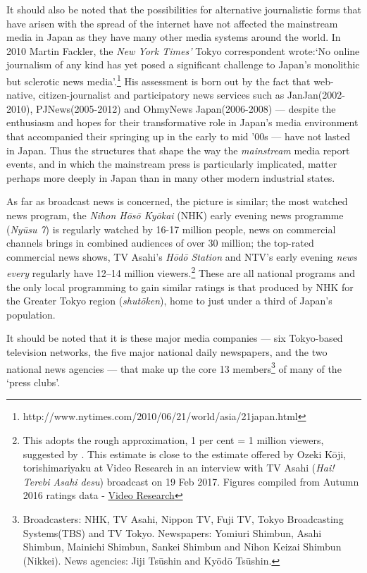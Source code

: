 \documentclass[11pt, headings=normal]{scrartcl}
\begin{document}
It should also be noted that the possibilities for alternative
journalistic forms that have arisen with the spread of the internet have
not affected the mainstream media in Japan as they have many other media
systems around the world. In 2010 Martin Fackler, the \emph{New York
Times'} Tokyo correspondent wrote:`No online journalism of any kind has
yet posed a significant challenge to Japan's monolithic but sclerotic
news media'\autocite{Fackler:2010}.\footnote{http://www.nytimes.com/2010/06/21/world/asia/21japan.html}
His assessment is born out by the fact that web-native,
citizen-journalist and participatory news services such as
JanJan(2002-2010), PJNews(2005-2012) and OhmyNews Japan(2006-2008) ---
despite the enthusiasm and hopes for their transformative role in
Japan's media environment that accompanied their springing up in the
early to mid '00s \autocite[ 72--3]{Hadl:2009} --- have not lasted in
Japan. Thus the structures that shape the way the \emph{mainstream}
media report events, and in which the mainstream press is particularly
implicated, matter perhaps more deeply in Japan than in many other
modern industrial states.

As far as broadcast news is concerned, the picture is similar; the most
watched news program, the \emph{Nihon Hōsō Kyōkai} (NHK) early evening
news programme (\emph{Nyūsu 7}) is regularly watched by 16-17 million
people, news on commercial channels brings in combined audiences of over
30 million; the top-rated commercial news shows, TV Asahi's \emph{Hōdō
Station} and NTV's early evening \emph{news every} regularly have 12--14
million viewers.\footnote{This adopts the rough approximation, 1 per
  cent = 1 million viewers, suggested by \textcite[29]{Torigoe:2002}.
  This estimate is close to the estimate offered by Ozeki Kōji,
  torishimariyaku at Video Research in an interview with TV Asahi
  (\emph{Hai! Terebi Asahi desu}) broadcast on 19 Feb 2017. Figures
  compiled from Autumn 2016 ratings data -
  \href{https://www.videor.co.jp/data/ratedata/backnum/2016/index.htm}{Video
  Research}} These are all national programs and the only local
programming to gain similar ratings is that produced by NHK for the
Greater Tokyo region (\emph{shutōken}), home to just under a third of
Japan's population.

It should be noted that it is these major media companies --- six
Tokyo-based television networks, the five major national daily
newspapers, and the two national news agencies --- that make up the core
13 members\footnote{Broadcasters: NHK, TV Asahi, Nippon TV, Fuji TV,
  Tokyo Broadcasting Systems(TBS) and TV Tokyo. Newspapers: Yomiuri
  Shimbun, Asahi Shimbun, Mainichi Shimbun, Sankei Shimbun and Nihon
  Keizai Shimbun (Nikkei). News agencies: Jiji Tsūshin and Kyōdō
  Tsūshin.} of many of the `press clubs'.
\end{document}
